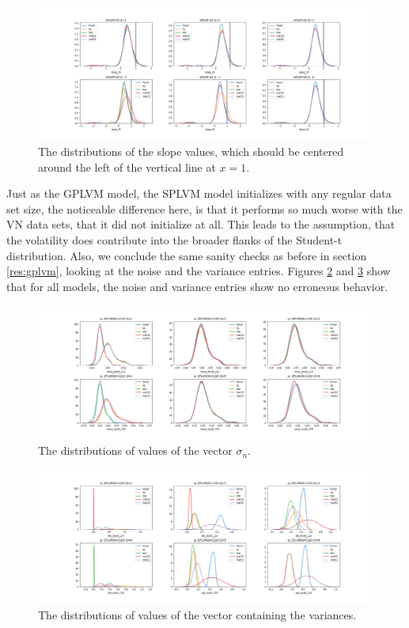 \begin{figure}%
	\centering
	\includegraphics[width=7in]{img/07_1/slope_fit_studt_120.png}
	\caption[SPLVM slope values for $N=120$, $D=754$]{The distributions of the slope values, which should be centered around the left of the vertical line at $x=1$. }
	\label{fig:studt_slopes}
\end{figure}
Just as the GPLVM model, the SPLVM model initializes with any regular data set size, the noticeable difference here, is that it performs so much worse with the VN data sets, that it did not initialize at all. This leads to the assumption, that the volatility does contribute into the broader flanks of the Student-t distribution. Also, we conclude the same sanity checks as before in section \ref{res:gplvm}, looking at the noise and the variance entries. Figures \ref{fig:studt_noises} and \ref{fig:studt_variances} show that for all models, the noise and variance entries show no erroneous behavior. 
\begin{figure}%
	\centering
	\includegraphics[width=7in]{img/07_1/noise_STUDT_120.png}
	\caption[SPLVM noise values for $N=120$, $D=754$]{The distributions of values of the vector $\sigma_n$. }
	\label{fig:studt_noises}
\end{figure}
\begin{figure}%
	\centering
	\includegraphics[width=7in]{img/07_1/std_STUDT_120.png}
	\caption[SPLVM variance values for $N=120$, $D=754$]{The distributions of values of the vector containing the variances.}
	\label{fig:studt_variances}
\end{figure}
